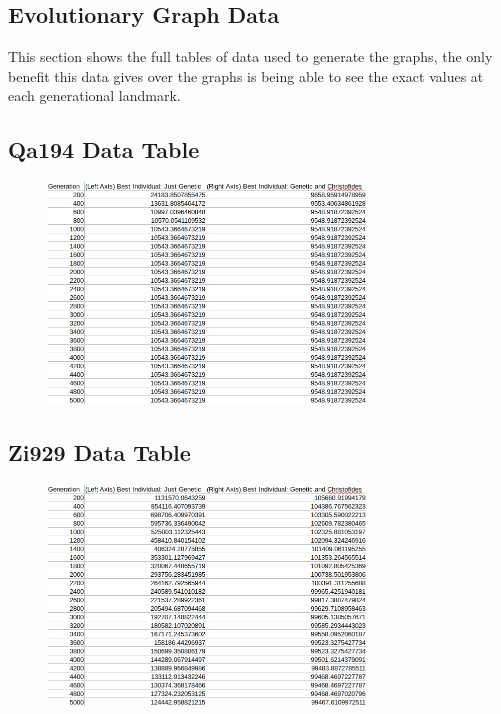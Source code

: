 \documentclass[11pt,a4paper,titlepage]{article}
\begin{document}
\begin{appendices}
\section{Evolutionary Graph Data}
This section shows the full tables of data used to generate the graphs, the only benefit this data gives over the graphs is being able to see the exact values at each generational landmark.

\subsection{Qa194 Data Table}

\begin{figure}[ht]
	\includegraphics[width=0.75\textwidth]{qa194Table}
	\centering
\end{figure}

\subsection{Zi929 Data Table}

\begin{figure}[ht]
	\includegraphics[width=0.75\textwidth]{zi929Table}
	\centering
\end{figure}


\end{appendices}
\end{document}
